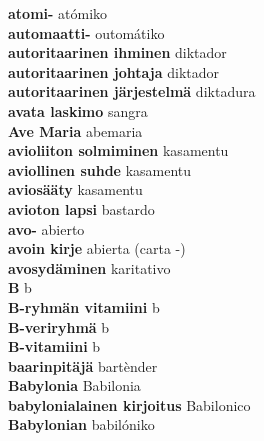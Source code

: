 \textbf{ atomi-  } atómiko \\
\textbf{ automaatti-  } outomátiko \\
\textbf{ autoritaarinen ihminen  } diktador \\
\textbf{ autoritaarinen johtaja  } diktador \\
\textbf{ autoritaarinen järjestelmä  } diktadura \\
\textbf{ avata laskimo  } sangra \\
\textbf{ Ave Maria  } abemaria \\
\textbf{ avioliiton solmiminen  } kasamentu \\
\textbf{ aviollinen suhde  } kasamentu \\
\textbf{ aviosääty  } kasamentu \\
\textbf{ avioton lapsi  } bastardo \\
\textbf{ avo-  } abierto \\
\textbf{ avoin kirje  } abierta (carta -) \\
\textbf{ avosydäminen  } karitativo \\
\textbf{ B  } b \\
\textbf{ B-ryhmän vitamiini  } b \\
\textbf{ B-veriryhmä  } b \\
\textbf{ B-vitamiini  } b \\
\textbf{ baarinpitäjä  } bartènder \\
\textbf{ Babylonia  } Babilonia \\
\textbf{ babylonialainen kirjoitus  } Babilonico \\
\textbf{ Babylonian  } babilóniko \\
